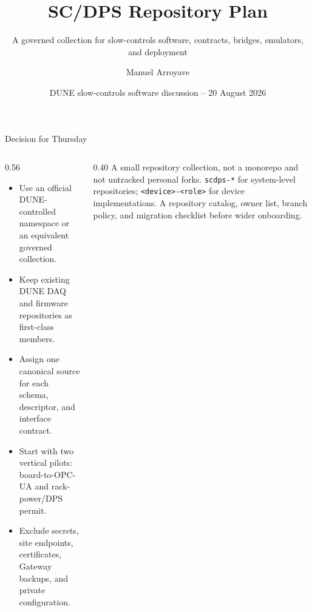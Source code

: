 \documentclass[aspectratio=169,10pt]{beamer}
\title[SC/DPS Repository Plan]{SC/DPS Repository Plan}
\subtitle{A governed collection for slow-controls software, contracts, bridges, emulators, and deployment}
\author{Manuel Arroyave}
\date{DUNE slow-controls software discussion -- 20 August 2026}
\begin{document}
\begin{frame}[plain]
  \titlepage
\end{frame}

\begin{frame}{Decision for Thursday}
\begin{columns}[T,onlytextwidth]
  \begin{column}{0.56\textwidth}
    \begin{itemize}
      \DuneTightList
      \item Use an official DUNE-controlled namespace or an equivalent governed collection.
      \item Keep existing DUNE DAQ and firmware repositories as first-class members.
      \item Assign one canonical source for each schema, descriptor, and interface contract.
      \item Start with two vertical pilots: board-to-OPC-UA and rack-power/DPS permit.
      \item Exclude secrets, site endpoints, certificates, Gateway backups, and private configuration.
    \end{itemize}
  \end{column}
  \begin{column}{0.40\textwidth}
      {A small repository collection, not a monorepo and not untracked personal forks.}
      {}
    \vspace{1.5mm}
      {\texttt{scdps-*} for system-level repositories; \texttt{<device>-<role>} for device implementations.}
      {}
    \vspace{1.5mm}
      {A repository catalog, owner list, branch policy, and migration checklist before wider onboarding.}
      {}
  \end{column}
\end{columns}
\end{frame}
\end{document}
